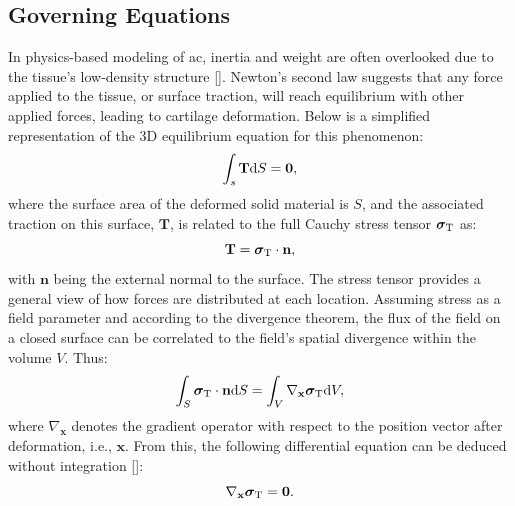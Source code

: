 \documentclass[12pt,a4paper]{report}
\begin{document}
\subsection{Governing Equations}
%
In physics-based modeling of \ac{ac}, inertia and weight are often overlooked due to the tissue's low-density structure [\cite{pearle2005}]. Newton's second law suggests that any force applied to the tissue, or surface traction, will reach equilibrium with other applied forces, leading to cartilage deformation. Below is a simplified representation of the 3D equilibrium equation for this phenomenon:
%
\begin{equation}
    \int_s \mathbf{T} {\rm d}S = \mathbf{0},
\end{equation}
%
where the surface area of the deformed solid material is $S$, and the associated traction on this surface, $\mathbf{T}$, is related to the full Cauchy stress tensor $\boldsymbol{\sigma}_{\rm T}$ as:
%
\begin{equation}\label{eq-traction}
    \mathbf{T} = \boldsymbol{\sigma}_{\rm T} \cdot \textbf{n},
\end{equation}
%
with $\textbf{n}$ being the external normal to the surface. The stress tensor provides a general view of how forces are distributed at each location. Assuming stress as a field parameter and according to the divergence theorem, the flux of the field on a closed surface can be correlated to the field's spatial divergence within the volume $V$. Thus:
%
\begin{equation}
    \int_S \boldsymbol{\sigma}_{\rm T} \cdot \textbf{n} {\rm d}S = \int_V \nabla_\textbf{x} \boldsymbol{\sigma}_{\rm T} {\rm d}V,
\end{equation}
%
where $\nabla_\textbf{x}$ denotes the gradient operator with respect to the position vector after deformation, i.e., $\textbf{x}$. From this, the following differential equation can be deduced without integration [\cite{gerhard-book}]:
%
\begin{equation}\label{eq-strong}
    \nabla_\textbf{x} \boldsymbol{\sigma}_{\rm T} = \textbf{0}.
\end{equation}
\end{document}
